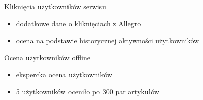 \documentclass{beamer}
\begin{document}
	\begin{frame}{Kliknięcia użytkowników serwisu}
		\begin{itemize}
			\item dodatkowe dane o kliknięciach z Allegro
			\item ocena na podstawie historycznej aktywności użytkowników
		\end{itemize}
	\end{frame}
	\begin{frame}{Ocena użytkowników offline}
		\begin{itemize}
			\item ekspercka ocena użytkowników
			\item 5 użytkowników oceniło po 300 par artykułów
		\end{itemize}
	\end{frame}
\end{document}
